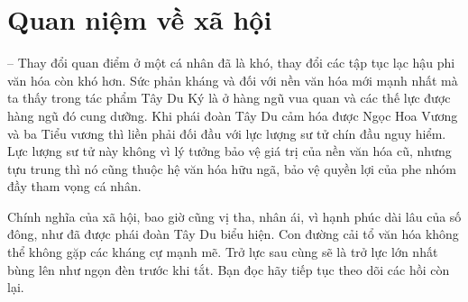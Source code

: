\section{Quan niệm về xã hội} %
\label{sec:88_89_90_xa_hoi}

-- Thay đổi quan điểm ở một cá nhân đã là khó, thay đổi các tập tục lạc hậu phi văn hóa còn khó hơn. Sức phản kháng và đối với nền văn hóa mới mạnh nhất mà ta thấy trong tác phẩm Tây Du Ký là ở hàng ngũ vua quan và các thế lực được hàng ngũ đó cung dưỡng. Khi phái đoàn Tây Du cảm hóa được Ngọc Hoa Vương và ba Tiểu vương thì liền phải đối đầu với lực lượng sư tử chín đầu nguy hiểm. Lực lượng sư tử này không vì lý tưởng bảo vệ giá trị của nền văn hóa cũ, nhưng tựu trung thì nó cũng thuộc hệ văn hóa hữu ngã, bảo vệ quyền lợi của phe nhóm đầy tham vọng cá nhân.

Chính nghĩa của xã hội, bao giờ cũng vị tha, nhân ái, vì hạnh phúc dài lâu của số đông, như đã được phái đoàn Tây Du biểu hiện. Con đường cải tổ văn hóa không thể không gặp các kháng cự mạnh mẽ. Trở lực sau cùng sẽ là trở lực lớn nhất bùng lên như ngọn đèn trước khi tắt. Bạn đọc hãy tiếp tục theo dõi các hồi còn lại.
